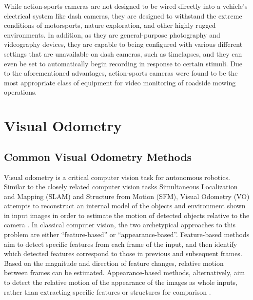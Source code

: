 \documentclass[
]{article}
\begin{document}
While action-sports cameras are not designed to be wired directly into a
vehicle's electrical system like dash cameras, they are designed to
withstand the extreme conditions of motorsports, nature exploration, and
other highly rugged environments. In addition, as they are
general-purpose photography and videography devices, they are capable to
being configured with various different settings that are unavailable on
dash cameras, such as timelapses, and they can even be set to
automatically begin recording in response to certain stimuli. Due to the
aforementioned advantages, action-sports cameras were found to be the
most appropriate class of equipment for video monitoring of roadside
mowing operations.

\section{Visual Odometry}\label{sec:visual_odo}

\subsection{Common Visual Odometry Methods}\label{sec:vo_lit}

Visual odometry is a critical computer vision task for autonomous
robotics. Similar to the closely related computer vision tasks
Simultaneous Localization and Mapping (SLAM) and Structure from Motion
(SFM), Visual Odometry (VO) attempts to reconstruct an internal model of
the objects and environment shown in input images in order to estimate
the motion of detected objects relative to the camera
\parencite{HerreraGranda_MonocularVisualSlam_2024}. In classical computer
vision, the two archetypical approaches to this problem are either
``feature-based'' or ``appearance-based''. Feature-based methods aim to
detect specific features from each frame of the input, and then identify
which detected features correspond to those in previous and subsequent
frames. Based on the magnitude and direction of feature changes,
relative motion between frames can be estimated. Appearance-based
methods, alternatively, aim to detect the relative motion of the
appearance of the images as whole inputs, rather than extracting
specific features or structures for comparison
\parencite{Scaramuzza_AppearanceGuidedMonocular_2008}.
\end{document}
